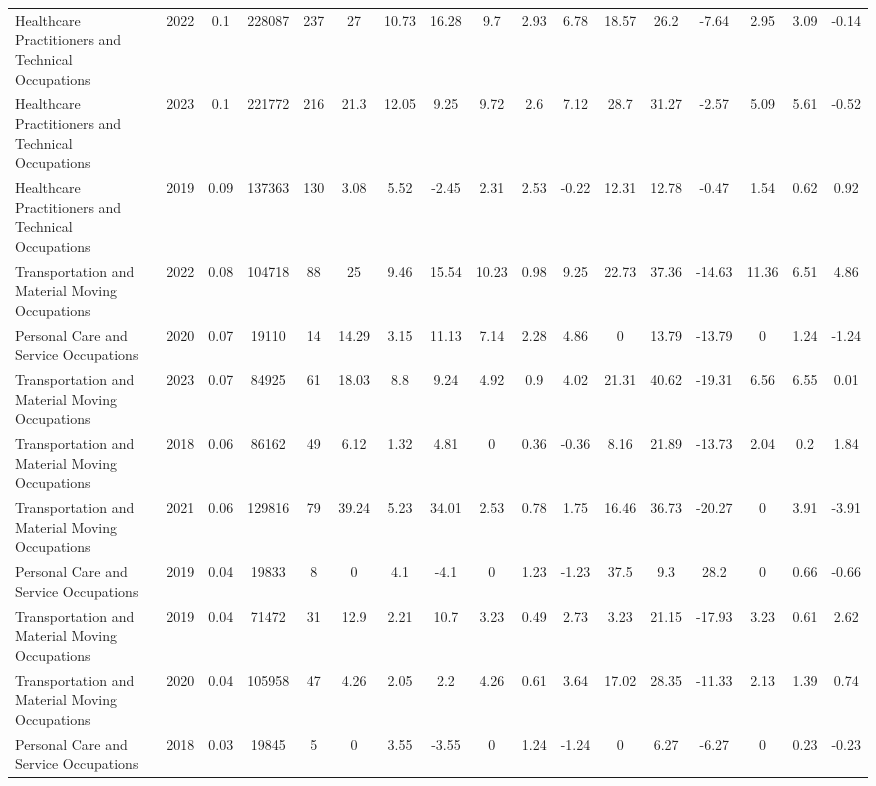\begin{landscape}
\begin{table}[htbp]
\begin{tabular}{lcccccccccccccccc}
Healthcare Practitioners and Technical Occupations & 2022 & 0.1 & 228087 & 237 & 27 & 10.73 & 16.28 & 9.7 & 2.93 & 6.78 & 18.57 & 26.2 & -7.64 & 2.95 & 3.09 & -0.14 \\
Healthcare Practitioners and Technical Occupations & 2023 & 0.1 & 221772 & 216 & 21.3 & 12.05 & 9.25 & 9.72 & 2.6 & 7.12 & 28.7 & 31.27 & -2.57 & 5.09 & 5.61 & -0.52 \\
Healthcare Practitioners and Technical Occupations & 2019 & 0.09 & 137363 & 130 & 3.08 & 5.52 & -2.45 & 2.31 & 2.53 & -0.22 & 12.31 & 12.78 & -0.47 & 1.54 & 0.62 & 0.92 \\
Transportation and Material Moving Occupations & 2022 & 0.08 & 104718 & 88 & 25 & 9.46 & 15.54 & 10.23 & 0.98 & 9.25 & 22.73 & 37.36 & -14.63 & 11.36 & 6.51 & 4.86 \\
Personal Care and Service Occupations & 2020 & 0.07 & 19110 & 14 & 14.29 & 3.15 & 11.13 & 7.14 & 2.28 & 4.86 & 0 & 13.79 & -13.79 & 0 & 1.24 & -1.24 \\
Transportation and Material Moving Occupations & 2023 & 0.07 & 84925 & 61 & 18.03 & 8.8 & 9.24 & 4.92 & 0.9 & 4.02 & 21.31 & 40.62 & -19.31 & 6.56 & 6.55 & 0.01 \\
Transportation and Material Moving Occupations & 2018 & 0.06 & 86162 & 49 & 6.12 & 1.32 & 4.81 & 0 & 0.36 & -0.36 & 8.16 & 21.89 & -13.73 & 2.04 & 0.2 & 1.84 \\
Transportation and Material Moving Occupations & 2021 & 0.06 & 129816 & 79 & 39.24 & 5.23 & 34.01 & 2.53 & 0.78 & 1.75 & 16.46 & 36.73 & -20.27 & 0 & 3.91 & -3.91 \\
Personal Care and Service Occupations & 2019 & 0.04 & 19833 & 8 & 0 & 4.1 & -4.1 & 0 & 1.23 & -1.23 & 37.5 & 9.3 & 28.2 & 0 & 0.66 & -0.66 \\
Transportation and Material Moving Occupations & 2019 & 0.04 & 71472 & 31 & 12.9 & 2.21 & 10.7 & 3.23 & 0.49 & 2.73 & 3.23 & 21.15 & -17.93 & 3.23 & 0.61 & 2.62 \\
Transportation and Material Moving Occupations & 2020 & 0.04 & 105958 & 47 & 4.26 & 2.05 & 2.2 & 4.26 & 0.61 & 3.64 & 17.02 & 28.35 & -11.33 & 2.13 & 1.39 & 0.74 \\
Personal Care and Service Occupations & 2018 & 0.03 & 19845 & 5 & 0 & 3.55 & -3.55 & 0 & 1.24 & -1.24 & 0 & 6.27 & -6.27 & 0 & 0.23 & -0.23 \\
\hline\hline
\end{tabular}
\end{table}
\end{landscape}
